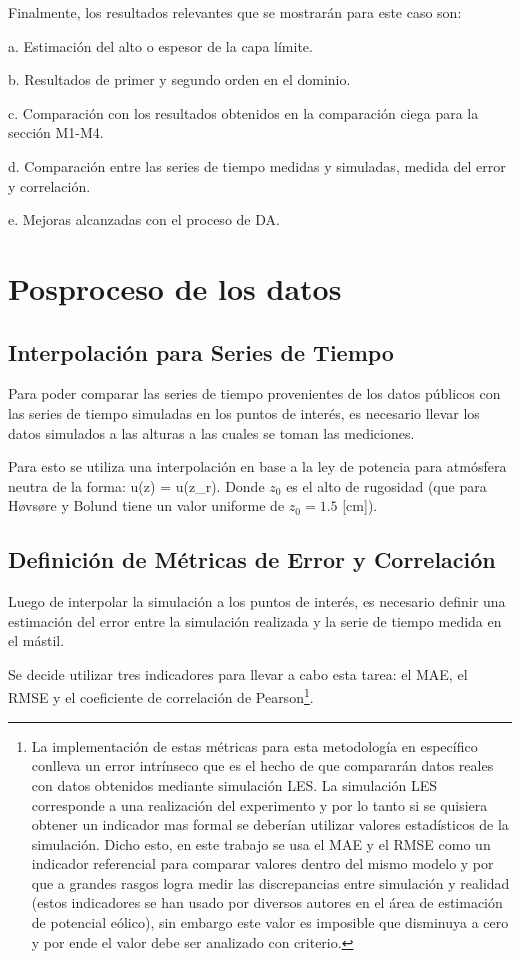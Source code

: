 Finalmente, los resultados relevantes que se mostrarán para este caso son:
\begin{enumerate*}
	\item[a.] Estimación del alto o espesor de la capa límite.
	\item[b.] Resultados de primer y segundo orden en el dominio.
	\item[c.] Comparación con los resultados obtenidos en la comparación ciega para la sección M1-M4.
	\item[d.] Comparación entre las series de tiempo medidas y simuladas, medida del error y correlación.
	\item[e.] Mejoras alcanzadas con el proceso de DA. 
\end{enumerate*}
\newpage
\section{Posproceso de los datos}
\subsection{Interpolación para Series de Tiempo}
Para poder comparar las series de tiempo provenientes de los datos públicos con las series de tiempo simuladas en los puntos de interés, es necesario llevar los datos simulados a las alturas a las cuales se toman las mediciones.

Para esto se utiliza una interpolación en base a la ley de potencia para atmósfera neutra de la forma:
\be 
u(z) = u(z_r).
\ee
Donde $z_0$ es el alto de rugosidad (que para Høvsøre y Bolund tiene un valor uniforme de $z_0=1.5$ [cm]).
\subsection{Definición de Métricas de Error y Correlación}
Luego de interpolar la simulación a los puntos de interés, es necesario definir una estimación del error entre la simulación realizada y la serie de tiempo medida en el mástil.

Se decide utilizar tres indicadores para llevar a cabo esta tarea: el MAE, el RMSE y el coeficiente de correlación de Pearson\footnote{La implementación de estas métricas para esta metodología en específico conlleva un error intrínseco que es el hecho de que compararán datos reales con datos obtenidos mediante simulación LES. La simulación LES corresponde a una realización del experimento y por lo tanto si se quisiera obtener un indicador mas formal se deberían utilizar valores estadísticos de la simulación. Dicho esto, en este trabajo se usa el MAE y el RMSE como un indicador referencial para comparar valores dentro del mismo modelo y por que a grandes rasgos logra medir las discrepancias entre simulación y realidad (estos indicadores se han usado por diversos autores en el área de estimación de potencial eólico), sin embargo este valor es imposible que disminuya a cero y por ende el valor debe ser analizado con criterio.}.

